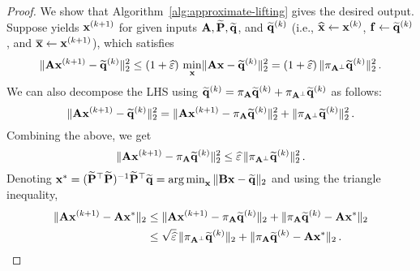 \begin{proof}
We show that Algorithm~\ref{alg:approximate-lifting} gives the desired output.
Suppose \ApproximateSolve yields $\mathbf{x}^{(k+1)}$ for given inputs $\mathbf{A},\widetilde{\mathbf{P}},\widetilde{\mathbf{q}}$, and $\widetilde{\mathbf{q}}^{(k)}$ (i.e., $\widehat{\mathbf{x}} \gets \mathbf{x}^{(k)}$, $\mathbf{f}\gets \widetilde{\mathbf{q}}^{(k)}$, and $\overline{\mathbf{x}} \gets \mathbf{x}^{(k+1)}$), which satisfies
\[
    \lVert\mathbf{A}\mathbf{x}^{(k+1)}-\widetilde{\mathbf{q}}^{(k)}\rVert_2^2\leq (1+\widehat{\varepsilon})\,\min_{\mathbf{x}} \lVert\mathbf{A}\mathbf{x}-\widetilde{\mathbf{q}}^{(k)}\rVert_2^2
    = (1+\widehat{\varepsilon})\,\lVert\pi_{\mathbf{A} ^\perp}\widetilde{\mathbf{q}}^{(k)}\rVert_2^2\,.
\]
We can also decompose the LHS using $\widetilde{\mathbf{q}}^{(k)} = \pi_{\mathbf{A}} \widetilde{\mathbf{q}}^{(k)} + \pi_{\mathbf{A} ^\perp} \widetilde{\mathbf{q}}^{(k)}$ as follows:
\[
    \lVert\mathbf{A}\mathbf{x}^{(k+1)}-\widetilde{\mathbf{q}}^{(k)}\rVert_2^2
    = 
    \lVert\mathbf{A}\mathbf{x}^{(k+1)} - \pi_{\mathbf{A}}\widetilde{\mathbf{q}}^{(k)}\rVert_2^2 + \lVert\pi_{\mathbf{A}^{\perp}} \widetilde{\mathbf{q}}^{(k)}\rVert_2^2\,.
\]
Combining the above, we get
\[
    \lVert\mathbf{A}\mathbf{x}^{(k+1)} - \pi_{\mathbf{A}}\widetilde{\mathbf{q}}^{(k)}\rVert_2^2
    \leq
    \widehat{\varepsilon}\, \lVert\pi_{\mathbf{A}^{\perp}}\widetilde{\mathbf{q}}^{(k)}\rVert_2^2\,.
\]
Denoting $\mathbf{x}^* = (\widetilde{\mathbf{P}}^\top \widetilde{\mathbf{P}})^{-1} \widetilde{\mathbf{P}}^\top \widetilde{\mathbf{q}} = \operatorname*{arg\,min}_{\mathbf{x}}\,\lVert\mathbf{Bx}-\widetilde{\mathbf{q}}\rVert_2$ and using the triangle inequality,
\begin{align}
\nonumber
    \lVert\mathbf{A}\mathbf{x}^{(k+1)} - \mathbf{A}\mathbf{x}^*\rVert_2
    &
    \leq \lVert\mathbf{A}\mathbf{x}^{(k+1)} - \pi_{\mathbf{A}}\widetilde{\mathbf{q}}^{(k)}\rVert_2 + \lVert\pi_{\mathbf{A}}\widetilde{\mathbf{q}}^{(k)} - \mathbf{A} \mathbf{x}^*\rVert_2
    \\ & \leq \label{eq:total-bound-on-a-norm}
    \sqrt{\widehat{\varepsilon}}\, \lVert\pi_{\mathbf{A}^{\perp}}\widetilde{\mathbf{q}}^{(k)}\rVert_2 + \lVert\pi_{\mathbf{A}}\widetilde{\mathbf{q}}^{(k)} - \mathbf{A} \mathbf{x}^*\rVert_2\,.
\end{align}


\end{proof}
